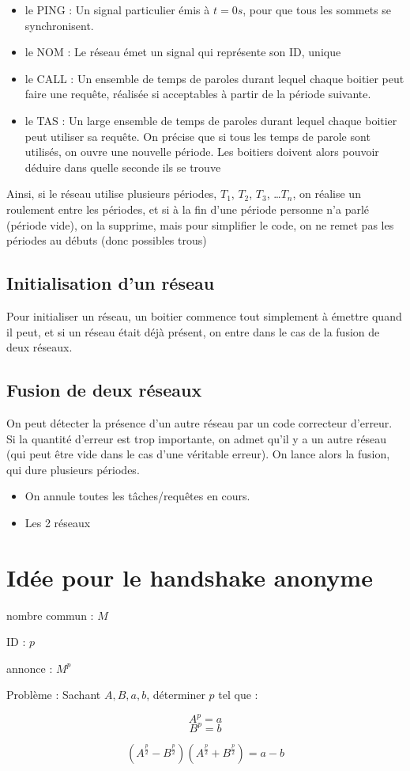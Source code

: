 \documentclass{article}
\begin{document}
\begin{itemize}
    \item le PING : Un signal particulier émis à $t=0s$, pour que tous les sommets se synchronisent.
    \item le NOM : Le réseau émet un signal qui représente son ID, unique
    \item le CALL : Un ensemble de temps de paroles durant lequel chaque boitier peut faire une requête, réalisée si acceptables à partir de la période suivante.
    \item le TAS : Un large ensemble de temps de paroles durant lequel chaque boitier peut utiliser sa requête. On précise que si tous les temps de parole sont utilisés, on ouvre une nouvelle période. Les boitiers doivent alors pouvoir déduire dans quelle seconde ils se trouve
\end{itemize}

Ainsi, si le réseau utilise plusieurs périodes, $T_1$, $T_2$, $T_3$, \dots $T_n$, on réalise un roulement entre les périodes, et si à la fin d'une période personne n'a parlé (période vide), on la supprime, mais pour simplifier le code, on ne remet pas les périodes au débuts (donc possibles trous)


\subsection{Initialisation d'un réseau}

Pour initialiser un réseau, un boitier commence tout simplement à émettre quand il peut, et si un réseau était déjà présent, on entre dans le cas de la fusion de deux réseaux.



\subsection{Fusion de deux réseaux}

On peut détecter la présence d'un autre réseau par un code correcteur d'erreur. Si la quantité d'erreur est trop importante, on admet qu'il y a un autre réseau (qui peut être vide dans le cas d'une véritable erreur). On lance alors la fusion, qui dure plusieurs périodes.

\begin{itemize}
    \item On annule toutes les tâches/requêtes en cours.
    \item Les 2 réseaux 
\end{itemize}




\newpage

\section*{Idée pour le handshake anonyme}

nombre commun : $M$

ID : $p$

annonce : $M^p$

\bigskip

Problème : Sachant $A, B, a, b$, déterminer $p$ tel que :

$$A^p = a$$
$$B^p = b$$

$$(A^{\frac{p}{2}}-B^{\frac{p}{2}})(A^{\frac{p}{2}}+B^{\frac{p}{2}})=a-b$$
\end{document}
